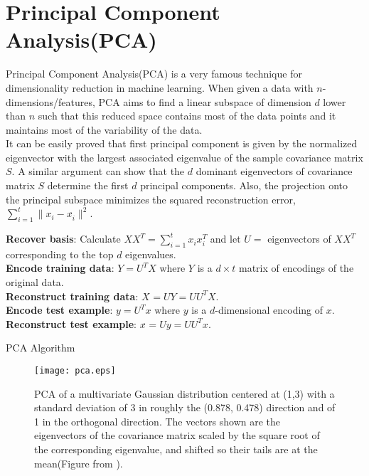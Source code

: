 \section{Principal Component Analysis(PCA)}
Principal Component Analysis(PCA) is a very famous technique for dimensionality reduction in machine learning. When given a data with $n$-dimensions/features, PCA aims to find a linear subspace of dimension $d$ lower than $n$ such that this reduced space contains most of the data points and it maintains most of the variability of the data.\\
It can be easily proved that first principal component is given by the normalized eigenvector with the largest associated eigenvalue of the sample covariance matrix $S$. A similar argument can show that the $d$ dominant eigenvectors of covariance matrix $S$ determine the first $d$ principal components. Also, the projection onto the principal subspace minimizes the squared reconstruction error,
$\sum_{i=1}^{t}\|x_i-x_i^{\widehat{}}\|^{2}$.
\LinesNumbered
\begin{algorithm}[ht]
\large
\textbf{Recover basis}: Calculate $XX^T=\sum_{i=1}^{t}x_ix_i^{T}$ and let $U=$ eigenvectors of $XX^T$ corresponding to the top $d$ eigenvalues.\\
\textbf{Encode training data}: $Y=U^TX$ where $Y$ is a $d \times t$ matrix of encodings of the original data.\\
\textbf{Reconstruct training data}: $X^{\widehat{}}=UY=UU^TX$.\\
\textbf{Encode test example}: $y=U^Tx$ where $y$ is a $d$-dimensional encoding of $x$.\\
\textbf{Reconstruct test example}: $x^{\widehat{}}=Uy=UU^Tx$.
\caption{PCA Algorithm\label{alg:pca}}
\end{algorithm}
\begin{figure}[ht!]
\centering
\texttt{[image: pca.eps]}
\caption{PCA of a multivariate Gaussian distribution centered at (1,3) with a standard deviation of 3 in roughly the (0.878, 0.478) direction and of 1 in the orthogonal direction. The vectors shown are the eigenvectors of the covariance matrix scaled by the square root of the corresponding eigenvalue, and shifted so their tails are at the mean(Figure from \cite{wiki:2015}). \label{fig:pca}}
\end{figure}

